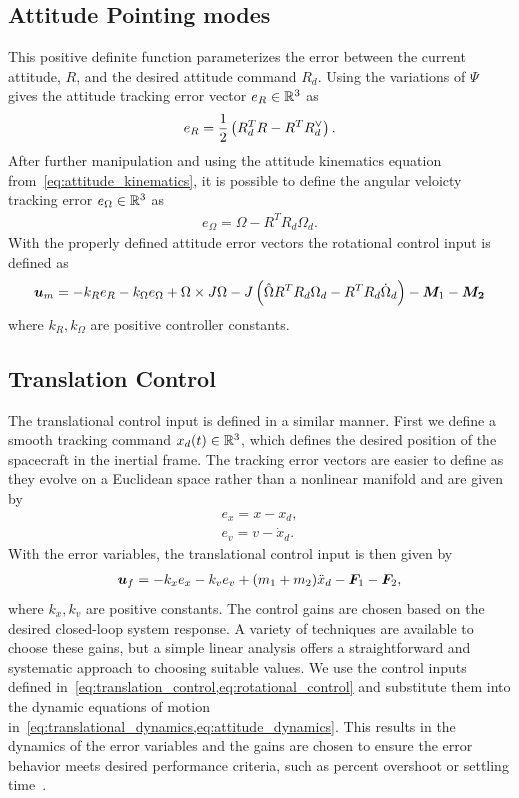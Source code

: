 \subsection{Attitude Pointing modes}

This positive definite function parameterizes the error between the current attitude, \( R \), and the desired attitude command \( R_d \).
Using the variations of \( \Psi \) gives the attitude tracking error vector \( e_R \in \mathbb{R}^3 \) as
\begin{align}\label{eq:attitude_error_vector}
    e_R = \frac{1}{2} \left( R_d^T R - R^T R_d^\vee \right).
\end{align}
After further manipulation and using the attitude kinematics equation from~\cref{eq:attitude_kinematics}, it is possible to define the angular veloicty tracking error \( e_\Omega \in \mathbb{R}^3 \) as
\begin{align}\label{eq:angular_velocity_error_vector}
    e_\Omega = \Omega - R^T R_d \Omega_d.
\end{align}
With the properly defined attitude error vectors the rotational control input is defined as 
\begin{align*}\label{eq:rotational_control}
    \bm{u}_m = - k_R e_R - k_\Omega e_\Omega + \Omega \times J \Omega - J \left( \hat{\Omega} R^T R_d \Omega_d - R^T R_d \dot{\Omega}_d \right) - \bm{M}_1 - \bm{M_2} 
\end{align*}
where \( k_R, k_\Omega \) are positive controller constants.

\subsection{Translation Control}
The translational control input is defined in a similar manner. 
First we define a smooth tracking command \( x_d(t) \in \mathbb{R}^3 \), which defines the desired position of the spacecraft in the inertial frame.
The tracking error vectors are easier to define as they evolve on a Euclidean space rather than a nonlinear manifold and are given by
\begin{align}
    e_x = x - x_d ,\\
    e_v = v - \dot{x}_d.
\end{align}
With the error variables, the translational control input is then given by
\begin{align}\label{eq:translation_control}
    \bm{u}_f = - k_x e_x  - k_v e_v + ( m_1  + m_2 ) \ddot{x}_d - \bm{F}_1 - \bm{F}_2 ,
\end{align}
where \( k_x, k_v \) are positive constants. 
The control gains are chosen based on the desired closed-loop system response. 
A variety of techniques are available to choose these gains, but a simple linear analysis offers a straightforward and systematic approach to choosing suitable values. 
We use the control inputs defined in~\cref{eq:translation_control,eq:rotational_control} and substitute them into the dynamic equations of motion in~\cref{eq:translational_dynamics,eq:attitude_dynamics}.
This results in the dynamics of the error variables and the gains are chosen to ensure the error behavior meets desired performance criteria, such as percent overshoot or settling time~\cite{nise2004}.


